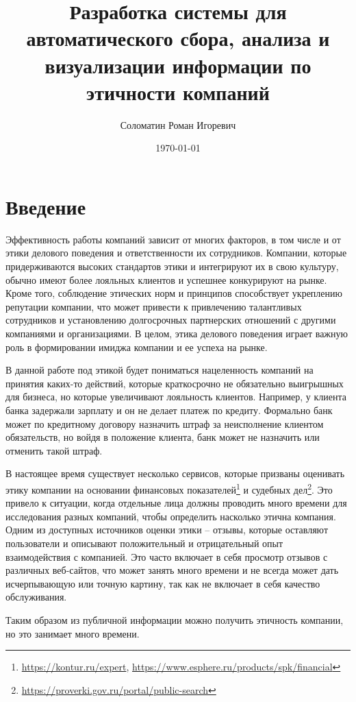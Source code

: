 \documentclass[PI, VKR]{HSEUniversity}
\author{Соломатин Роман Игоревич}
\date{\today}
\title{Разработка системы для автоматического сбора, анализа и визуализации информации по этичности компаний}
\begin{document}
\maketitle


\chapter*{Введение}
\label{sec:org376551e}
Эффективность работы компаний зависит от многих факторов, в том числе и от этики делового поведения и ответственности их сотрудников. Компании, которые придерживаются высоких стандартов этики и интегрируют их в свою культуру, обычно имеют более лояльных клиентов и успешнее конкурируют на рынке\autocite{mure_esg_2021}. Кроме того, соблюдение этических норм и принципов способствует укреплению репутации компании, что может привести к привлечению талантливых сотрудников и установлению долгосрочных партнерских отношений с другими компаниями и организациями. В целом, этика делового поведения играет важную роль в формировании имиджа компании и ее успеха на рынке.

В данной работе под этикой будет пониматься нацеленность компаний на принятия каких-то действий, которые краткосрочно не обязательно выигрышных для бизнеса, но которые увеличивают лояльность клиентов. Например, у клиента банка задержали зарплату и он не делает платеж по кредиту. Формально банк может по кредитному договору назначить штраф за неисполнение клиентом обязательств, но войдя в положение клиента, банк может не назначить или отменить такой штраф.

В настоящее время существует несколько сервисов, которые призваны оценивать этику компании на основании финансовых показателей\footnote{\url{https://kontur.ru/expert}, \url{https://www.esphere.ru/products/spk/financial}} и судебных дел\footnote{\url{https://proverki.gov.ru/portal/public-search}}. Это привело к ситуации, когда отдельные лица должны проводить много времени для исследования разных компаний, чтобы определить насколько этична компания. Одним из доступных источников оценки этики -- отзывы, которые оставляют пользователи и описывают положительный и отрицательный опыт взаимодействия с компанией. Это часто включает в себя просмотр отзывов с различных веб-сайтов, что может занять много времени и не всегда может дать исчерпывающую или точную картину, так как не включает в себя качество обслуживания.

Таким образом из публичной информации можно получить этичность компании, но это занимает много времени.
\end{document}
